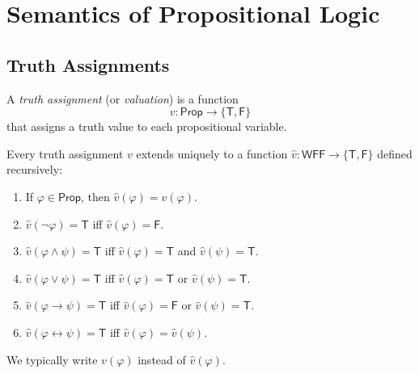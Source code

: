
\section{Semantics of Propositional Logic}

\subsection{Truth Assignments}

\begin{definition}
A \emph{truth assignment} (or \emph{valuation}) is a function
\[
v : \mathsf{Prop} \to \{\mathsf{T}, \mathsf{F}\}
\]
that assigns a truth value to each propositional variable.
\end{definition}

\begin{definition}
Every truth assignment $v$ extends uniquely to a function
$\hat{v} : \mathsf{WFF} \to \{\mathsf{T}, \mathsf{F}\}$ defined recursively:

\begin{enumerate}
  \item If $\varphi \in \mathsf{Prop}$, then $\hat{v}(\varphi) = v(\varphi)$.

  \item $\hat{v}(\neg\varphi) = \mathsf{T}$ iff $\hat{v}(\varphi) = \mathsf{F}$.

  \item $\hat{v}(\varphi \wedge \psi) = \mathsf{T}$ iff
        $\hat{v}(\varphi) = \mathsf{T}$ and $\hat{v}(\psi) = \mathsf{T}$.

  \item $\hat{v}(\varphi \vee \psi) = \mathsf{T}$ iff
        $\hat{v}(\varphi) = \mathsf{T}$ or $\hat{v}(\psi) = \mathsf{T}$.

  \item $\hat{v}(\varphi \rightarrow \psi) = \mathsf{T}$ iff
        $\hat{v}(\varphi) = \mathsf{F}$ or $\hat{v}(\psi) = \mathsf{T}$.

  \item $\hat{v}(\varphi \leftrightarrow \psi) = \mathsf{T}$ iff
        $\hat{v}(\varphi) = \hat{v}(\psi)$.
\end{enumerate}

We typically write $v(\varphi)$ instead of $\hat{v}(\varphi)$.
\end{definition}

